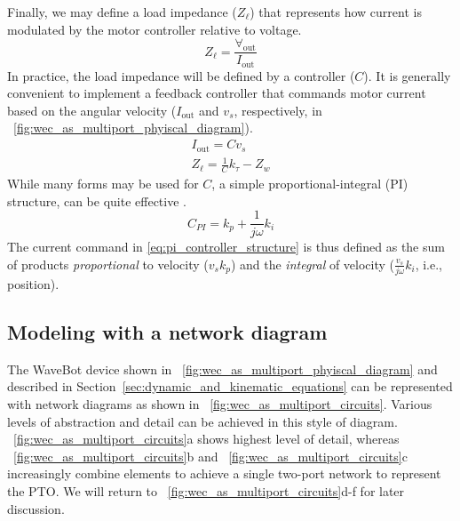 \documentclass[lettersize,journal]{IEEEtran}
\begin{document}
Finally, we may define a load impedance ($Z_\ell$) that represents how current is modulated by the motor controller relative to voltage.
%
\begin{equation}
        Z_\ell = \frac{\forall_{\textrm{out}}}{I_{\textrm{out}}}
        \label{eq:load_impedance}
\end{equation}
%
In practice, the load impedance will be defined by a controller ($C$).
It is generally convenient to implement a feedback controller that commands motor current based on the angular velocity ($I_{\textrm{out}}$ and $v_s$, respectively, in \figurename~\ref{fig:wec_as_multiport_phyiscal_diagram}).
%
\begin{subequations}
\begin{gather}
        I_{\textrm{out}} = C v_s \\  
        Z_\ell = \frac{1}{C} k_\tau - Z_w     
\end{gather}
\end{subequations}
%
While many forms may be used for $C$, a simple proportional-integral (PI) structure, can be quite effective \cite{Coe2020a}.
%
\begin{equation}
        C_{PI} = k_p + \frac{1}{j \omega} k_i 
        \label{eq:pi_controller_structure}
\end{equation}
%
The current command in \eqref{eq:pi_controller_structure} is thus defined as the sum of products \emph{proportional} to velocity ($v_s k_p$) and the \emph{integral} of velocity ($\frac{v_s}{j \omega} k_i$, i.e., position).

\subsection{Modeling with a network diagram}\label{sec:modeling_with_a_network_diagram}

The WaveBot device shown in \figurename~\ref{fig:wec_as_multiport_phyiscal_diagram} and described in Section~\ref{sec:dynamic_and_kinematic_equations} can be represented with network diagrams as shown in \figurename~\ref{fig:wec_as_multiport_circuits}.
Various levels of abstraction and detail can be achieved in this style of diagram.
\figurename~\ref{fig:wec_as_multiport_circuits}a shows highest level of detail, whereas \figurename~\ref{fig:wec_as_multiport_circuits}b and \figurename~\ref{fig:wec_as_multiport_circuits}c increasingly combine elements to achieve a single two-port network to represent the PTO.
We will return to \figurename~\ref{fig:wec_as_multiport_circuits}d-f for later discussion.
\end{document}
